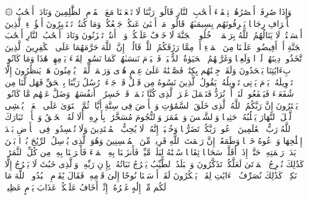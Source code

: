 \startbuffer[\q:7:47]
۞ وَإِذَا صُرِفَتۡ أَبۡصَٰرُهُمۡ تِلۡقَاۤءَ أَصۡحَٰبِ ٱلنَّارِ قَالُوا۟ رَبَّنَا لَا تَجۡعَلۡنَا مَعَ ٱلۡقَوۡمِ ٱلظَّٰلِمِینَ%
\stopbuffer
\startbuffer[\q:7:48]
وَنَادَىٰۤ أَصۡحَٰبُ ٱلۡأَعۡرَافِ رِجَالࣰا یَعۡرِفُونَهُم بِسِیمَىٰهُمۡ قَالُوا۟ مَاۤ أَغۡنَىٰ عَنكُمۡ جَمۡعُكُمۡ وَمَا كُنتُمۡ تَسۡتَكۡبِرُونَ%
\stopbuffer
\startbuffer[\q:7:49]
أَهَٰۤؤُلَاۤءِ ٱلَّذِینَ أَقۡسَمۡتُمۡ لَا یَنَالُهُمُ ٱللَّهُ بِرَحۡمَةٍۚ ٱدۡخُلُوا۟ ٱلۡجَنَّةَ لَا خَوۡفٌ عَلَیۡكُمۡ وَلَاۤ أَنتُمۡ تَحۡزَنُونَ%
\stopbuffer
\startbuffer[\q:7:50]
وَنَادَىٰۤ أَصۡحَٰبُ ٱلنَّارِ أَصۡحَٰبَ ٱلۡجَنَّةِ أَنۡ أَفِیضُوا۟ عَلَیۡنَا مِنَ ٱلۡمَاۤءِ أَوۡ مِمَّا رَزَقَكُمُ ٱللَّهُۚ قَالُوۤا۟ إِنَّ ٱللَّهَ حَرَّمَهُمَا عَلَى ٱلۡكَٰفِرِینَ%
\stopbuffer
\startbuffer[\q:7:51]
ٱلَّذِینَ ٱتَّخَذُوا۟ دِینَهُمۡ لَهۡوࣰا وَلَعِبࣰا وَغَرَّتۡهُمُ ٱلۡحَیَوٰةُ ٱلدُّنۡیَاۚ فَٱلۡیَوۡمَ نَنسَىٰهُمۡ كَمَا نَسُوا۟ لِقَاۤءَ یَوۡمِهِمۡ هَٰذَا وَمَا كَانُوا۟ بِءَایَٰتِنَا یَجۡحَدُونَ%
\stopbuffer
\startbuffer[\q:7:52]
وَلَقَدۡ جِئۡنَٰهُم بِكِتَٰبࣲ فَصَّلۡنَٰهُ عَلَىٰ عِلۡمٍ هُدࣰى وَرَحۡمَةࣰ لِّقَوۡمࣲ یُؤۡمِنُونَ%
\stopbuffer
\startbuffer[\q:7:53]
هَلۡ یَنظُرُونَ إِلَّا تَأۡوِیلَهُۥۚ یَوۡمَ یَأۡتِی تَأۡوِیلُهُۥ یَقُولُ ٱلَّذِینَ نَسُوهُ مِن قَبۡلُ قَدۡ جَاۤءَتۡ رُسُلُ رَبِّنَا بِٱلۡحَقِّ فَهَل لَّنَا مِن شُفَعَاۤءَ فَیَشۡفَعُوا۟ لَنَاۤ أَوۡ نُرَدُّ فَنَعۡمَلَ غَیۡرَ ٱلَّذِی كُنَّا نَعۡمَلُۚ قَدۡ خَسِرُوۤا۟ أَنفُسَهُمۡ وَضَلَّ عَنۡهُم مَّا كَانُوا۟ یَفۡتَرُونَ%
\stopbuffer
\startbuffer[\q:7:54]
إِنَّ رَبَّكُمُ ٱللَّهُ ٱلَّذِی خَلَقَ ٱلسَّمَٰوَٰتِ وَٱلۡأَرۡضَ فِی سِتَّةِ أَیَّامࣲ ثُمَّ ٱسۡتَوَىٰ عَلَى ٱلۡعَرۡشِۖ یُغۡشِی ٱلَّیۡلَ ٱلنَّهَارَ یَطۡلُبُهُۥ حَثِیثࣰا وَٱلشَّمۡسَ وَٱلۡقَمَرَ وَٱلنُّجُومَ مُسَخَّرَٰتِۭ بِأَمۡرِهِۦۤۗ أَلَا لَهُ ٱلۡخَلۡقُ وَٱلۡأَمۡرُۗ تَبَارَكَ ٱللَّهُ رَبُّ ٱلۡعَٰلَمِینَ%
\stopbuffer
\startbuffer[\q:7:55]
ٱدۡعُوا۟ رَبَّكُمۡ تَضَرُّعࣰا وَخُفۡیَةًۚ إِنَّهُۥ لَا یُحِبُّ ٱلۡمُعۡتَدِینَ%
\stopbuffer
\startbuffer[\q:7:56]
وَلَا تُفۡسِدُوا۟ فِی ٱلۡأَرۡضِ بَعۡدَ إِصۡلَٰحِهَا وَٱدۡعُوهُ خَوۡفࣰا وَطَمَعًاۚ إِنَّ رَحۡمَتَ ٱللَّهِ قَرِیبࣱ مِّنَ ٱلۡمُحۡسِنِینَ%
\stopbuffer
\startbuffer[\q:7:57]
وَهُوَ ٱلَّذِی یُرۡسِلُ ٱلرِّیَٰحَ بُشۡرَۢا بَیۡنَ یَدَیۡ رَحۡمَتِهِۦۖ حَتَّىٰۤ إِذَاۤ أَقَلَّتۡ سَحَابࣰا ثِقَالࣰا سُقۡنَٰهُ لِبَلَدࣲ مَّیِّتࣲ فَأَنزَلۡنَا بِهِ ٱلۡمَاۤءَ فَأَخۡرَجۡنَا بِهِۦ مِن كُلِّ ٱلثَّمَرَٰتِۚ كَذَٰلِكَ نُخۡرِجُ ٱلۡمَوۡتَىٰ لَعَلَّكُمۡ تَذَكَّرُونَ%
\stopbuffer
\startbuffer[\q:7:58]
وَٱلۡبَلَدُ ٱلطَّیِّبُ یَخۡرُجُ نَبَاتُهُۥ بِإِذۡنِ رَبِّهِۦۖ وَٱلَّذِی خَبُثَ لَا یَخۡرُجُ إِلَّا نَكِدࣰاۚ كَذَٰلِكَ نُصَرِّفُ ٱلۡءَایَٰتِ لِقَوۡمࣲ یَشۡكُرُونَ%
\stopbuffer
\startbuffer[\q:7:59]
لَقَدۡ أَرۡسَلۡنَا نُوحًا إِلَىٰ قَوۡمِهِۦ فَقَالَ یَٰقَوۡمِ ٱعۡبُدُوا۟ ٱللَّهَ مَا لَكُم مِّنۡ إِلَٰهٍ غَیۡرُهُۥۤ إِنِّیۤ أَخَافُ عَلَیۡكُمۡ عَذَابَ یَوۡمٍ عَظِیمࣲ%
